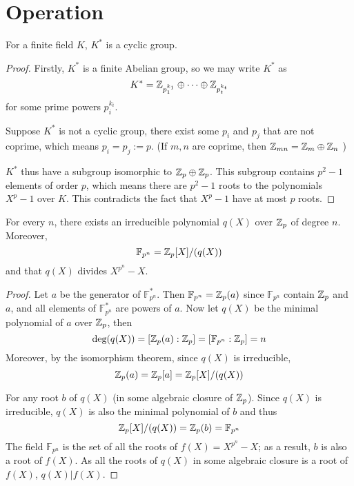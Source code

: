 \section{Operation}

\begin{lemma}
\label{lem-3}
For a finite field $K$, $K^*$ is a cyclic group.
\end{lemma}

\begin{proof}

Firstly, $K^*$ is a finite Abelian group, so we may write $K^*$  as
\[
	K^* = \mathbb{Z}_{p_1^{k_1}} \oplus \cdots \oplus \mathbb{Z}_{p_t^{k_t}}
\]
for some prime powers $p_i^{k_i}$.

Suppose $K^*$ is not a cyclic group, there exist some $p_i$ and $p_j$ that are not coprime, which means $p_i = p_j := p$. (If $m,n$ are coprime, then $\mathbb{Z}_{mn} = \mathbb{Z}_m \oplus \mathbb{Z}_n$ )

$K^*$ thus have a subgroup isomorphic to $\mathbb{Z}_p \oplus \mathbb{Z}_p$. This subgroup contains $p^2 - 1$ elements of order $p$, which means there are $p^2 - 1$ roots to the polynomials $X^p - 1$ over $K$. This contradicts the fact that $X^p-1$ have at most $p$ roots.

\end{proof}


\begin{theorem}
\label{thm-4}
For every $n$, there exists an irreducible polynomial $q(X)$ over $\mathbb{Z}_p$ of degree $n$. Moreover,
\[
	\mathbb{F}_{p^n} = \mathbb{Z}_p[X] / (q(X))
\]
and that $q(X)$ divides $X^{p^n} - X$.

\end{theorem}

\begin{proof}

Let $a$ be the generator of $\mathbb{F}_{p^n}^*$. Then $\mathbb{F}_{p^n} = \mathbb{Z}_p(a)$ since $\mathbb{F}_{p^n}$ contain $\mathbb{Z}_p$ and $a$, and all elements of $\mathbb{F}_{p^n}^*$ are powers of $a$. Now let $q(X)$ be the minimal polynomial of $a$ over $\mathbb{Z}_p$, then
\[
	\text{deg}(q(X)) = [\mathbb{Z}_p(a): \mathbb{Z}_p] = [\mathbb{F}_{p^n}:\mathbb{Z}_p] = n
\]
Moreover, by the isomorphism theorem, since $q(X)$ is irreducible,
\[
	\mathbb{Z}_p(a) = \mathbb{Z}_p[a] = \mathbb{Z}_p[X] / (q(X))
\]

For any root $b$ of $q(X)$ (in some algebraic closure of $\mathbb{Z}_p$). Since $q(X)$ is irreducible, $q(X)$ is also the minimal polynomial of $b$ and thus
\[
	\mathbb{Z}_p[X] / (q(X)) = \mathbb{Z}_p(b) = \mathbb{F}_{p^n}
\]
The field $\mathbb{F}_{p^n}$ is the set of all the roots of $f(X) = X^{p^n} - X$; as a result, $b$ is also a root of $f(X)$.
As all the roots of $q(X)$ in some algebraic closure is a root of $f(X)$, $q(X) | f(X)$.

\end{proof}


